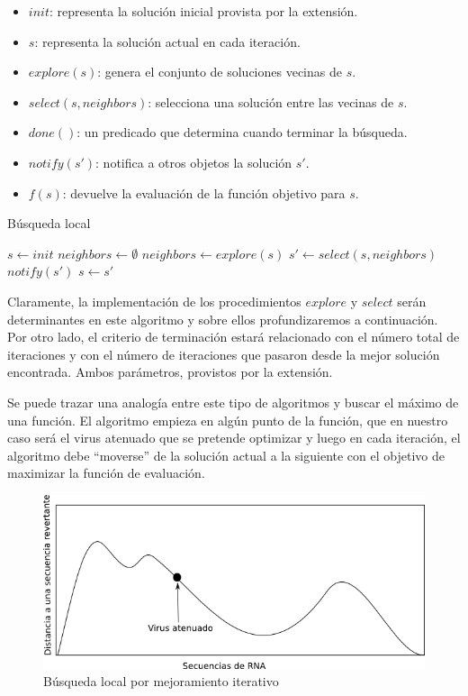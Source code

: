 \begin{itemize}
 \item $init$: representa la soluci\'on inicial provista por la extensi\'on.
 \item $s$: representa la soluci\'on actual en cada iteraci\'on.
 \item $explore(s)$: genera el conjunto de soluciones vecinas de $s$.
 \item $select(s, neighbors)$: selecciona una soluci\'on entre las vecinas de
$s$.
 \item $done()$: un predicado que determina cuando terminar la b\'usqueda.
 \item $notify(s')$: notifica a otros objetos la soluci\'on $s'$.
 \item $f(s)$: devuelve la evaluaci\'on de la funci\'on objetivo para $s$.
\end{itemize}

\begin{algorithm}
 \caption{B\'usqueda local}
 \begin{algorithmic}[1]
  \STATE $s \leftarrow init$
  \STATE $neighbors \leftarrow \emptyset$
  \REPEAT
  \STATE $neighbors \leftarrow explore(s)$
  \STATE $s' \leftarrow select(s, neighbors)$  
  \STATE $notify(s')$
  \ENDIF
  \STATE $s \leftarrow s'$
 \end{algorithmic}
\end{algorithm}

Claramente, la implementaci\'on de los procedimientos $explore$ y $select$
ser\'an determinantes en este algoritmo y sobre ellos profundizaremos a
continuaci\'on. Por otro lado, el criterio de terminaci\'on estar\'a
relacionado con el n\'umero total de iteraciones y con el n\'umero de
iteraciones que pasaron desde la mejor soluci\'on encontrada. Ambos
par\'ametros, provistos por la extensi\'on.

Se puede trazar una analog\'ia entre este tipo de algoritmos y buscar el
m\'aximo de una funci\'on. El algoritmo empieza en alg\'un punto de la
funci\'on, que en nuestro caso ser\'a el virus atenuado que se pretende
optimizar y luego en cada iteraci\'on, el algoritmo debe ``moverse'' de la
soluci\'on actual a la siguiente con el objetivo de maximizar la funci\'on de
evaluaci\'on.
\begin{figure}
 \centering
 \includegraphics[scale=.75]{hillclimbing.png}
 \caption{B\'usqueda local por mejoramiento iterativo}
 \label{hillclimbing}
\end{figure}


